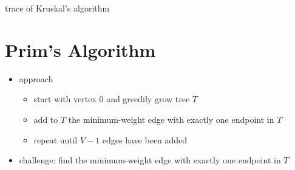 \documentclass[8pt,a4paper,compress]{beamer}
\begin{document}
\begin{frame}[fragile]
\begin{minipage}{100pt}
\begin{center}
\smallskip

\tiny trace of Kruskal's algorithm
\end{center}
\end{minipage}
\end{frame}

\section{Prim's Algorithm}
\begin{frame}[fragile]
\begin{itemize}
\item approach
\begin{itemize}
\item start with vertex 0 and greedily grow tree $T$

\item add to $T$ the minimum-weight edge with exactly one endpoint in $T$

\item repeat until $V - 1$ edges have been added
\end{itemize}

\item challenge: find the minimum-weight edge with exactly one endpoint in $T$
\end{itemize}
\end{frame}
\end{document}
